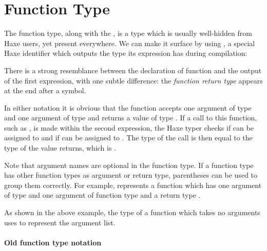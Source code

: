 


\section{Function Type}
\label{types-function}


The function type, along with the , is a type which is usually well-hidden from Haxe users, yet present everywhere. We can make it surface by using , a special Haxe identifier which outputs the type its expression has during compilation:


There is a strong resemblance between the declaration of function  and the output of the first  expression, with one subtle difference: the \emph{function return type} appears at the end after a \expr{->} symbol.

In either notation it is obvious that the function  accepts one argument of type  and one argument of type  and returns a value of type . If a call to this function, such as , is made within the second  expression, the Haxe typer checks if  can be assigned to  and if  can be assigned to . The type of the call is then equal to the type of the value  returns, which is .

Note that argument names are optional in the function type. If a function type has other function types as argument or return type, parentheses can be used to group them correctly. For example,  represents a function which has one argument of type  and one argument of function type  and a return type .


As shown in the above example, the type of a function which takes no arguments uses \expr{()} to represent the argument list.

\paragraph{Old function type notation}

